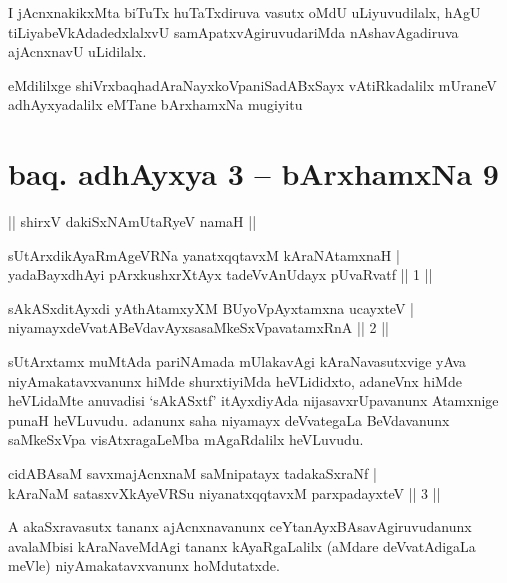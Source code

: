 \begin{artha}
I jAcnxnakikxMta biTuTx huTaTxdiruva vasutx oMdU uLiyuvudilalx, hAgU tiLiyabeVkAdadedxlalxvU samApatxvAgiruvudariMda nAshavAgadiruva ajAcnxnavU uLidilalx.
\end{artha}

\begin{center}
eMdililxge shiVrxbaqhadAraNayxkoVpaniSadABxSayx vAtiRkadalilx mUraneV adhAyxyadalilx eMTane bArxhamxNa mugiyitu
\end{center}

\section*{baq. adhAyxya 3 -- bArxhamxNa 9}

\begin{center}%
|| shirxV dakiSxNAmUtaRyeV namaH ||
\end{center}

\begin{shl}
sUtArxdikAyaRmAgeVRNa yanatxqqtavxM kAraNAtamxnaH |\\
yadaBayxdhAyi pArxkushxrXtAyx tadeVvAnUdayx pUvaRvatf \hfill || 1 ||
\end{shl}

\begin{shl}
sAkASxditAyxdi yAthAtamxyXM BUyoV\s pAyxtamxna ucayxteV |\\
niyamayxdeVvatABeVdavAyxsasaMkeSxVpavatamxRnA \hfill || 2 ||
\end{shl}

\begin{artha}
sUtArxtamx muMtAda pariNAmada mUlakavAgi kAraNavasutxvige yAva niyAmakatavxvanunx hiMde shurxtiyiMda heVLididxto, adaneVnx hiMde heVLidaMte anuvadisi `sAkASxtf' itAyxdiyAda nijasavxrUpavanunx Atamxnige punaH heVLuvudu. adanunx saha niyamayx deVvategaLa BeVdavanunx saMkeSxVpa visAtxragaLeMba mAgaRdalilx heVLuvudu.
\end{artha}


\begin{shl}
cidABAsaM savxmajAcnxnaM saMnipatayx tadakaSxraNf |\\
kAraNaM satasxvXkAyeVRSu niyanatxqqtavxM parxpadayxteV \hfill || 3 ||
\end{shl}

\begin{artha}
A akaSxravasutx tananx ajAcnxnavanunx ceYtanAyxBAsavAgiruvudanunx avalaMbisi kAraNa\-veMdAgi tananx kAyaRgaLalilx (aMdare deVvatAdigaLa meVle) niyAmakatavxvanunx hoMdutatxde.
\end{artha}

